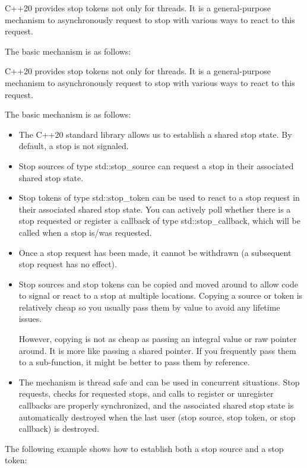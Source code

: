 
C++20 provides stop tokens not only for threads. It is a general-purpose mechanism to asynchronously request to stop with various ways to react to this request.

The basic mechanism is as follows:

C++20 provides stop tokens not only for threads. It is a general-purpose mechanism to asynchronously request to stop with various ways to react to this request.

The basic mechanism is as follows:

\begin{itemize}
\item 
The C++20 standard library allows us to establish a shared stop state. By default, a stop is not signaled.

\item 
Stop sources of type std::stop\_source can request a stop in their associated shared stop state.

\item 
Stop tokens of type std::stop\_token can be used to react to a stop request in their associated shared stop state. You can actively poll whether there is a stop requested or register a callback of type std::stop\_callback, which will be called when a stop is/was requested.

\item 
Once a stop request has been made, it cannot be withdrawn (a subsequent stop request has no effect).

\item 
Stop sources and stop tokens can be copied and moved around to allow code to signal or react to a stop at multiple locations. Copying a source or token is relatively cheap so you usually pass them by value to avoid any lifetime issues.

However, copying is not as cheap as passing an integral value or raw pointer around. It is more like passing a shared pointer. If you frequently pass them to a sub-function, it might be better to pass them by reference.

\item 
The mechanism is thread safe and can be used in concurrent situations. Stop requests, checks for requested stops, and calls to register or unregister callbacks are properly synchronized, and the associated shared stop state is automatically destroyed when the last user (stop source, stop token, or stop callback) is destroyed.
\end{itemize}

The following example shows how to establish both a stop source and a stop token:

